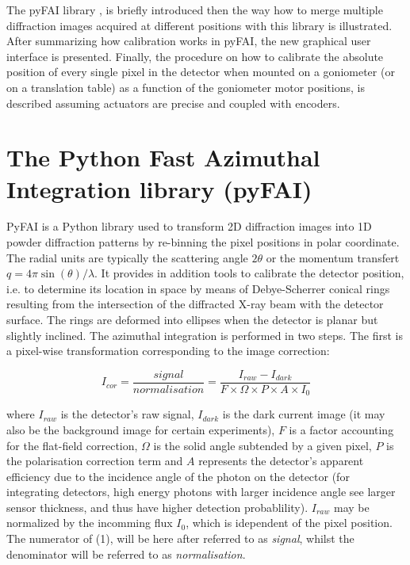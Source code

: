 \documentclass[preprint]{iucr}              %
\begin{document}
The pyFAI library \cite{fv5028}, is briefly introduced then the way how to
merge multiple diffraction images acquired at different positions with this
library \cite{PyFAI_PDJ} is illustrated. 
After summarizing how calibration works in pyFAI, the new graphical user
interface is presented.
Finally, the procedure on how to calibrate the absolute position of
every single pixel in the detector when mounted on a goniometer (or on a
translation table) as a function of the goniometer motor positions, is
described assuming actuators are precise and coupled with encoders. 

\section{The Python Fast Azimuthal Integration library (pyFAI)}

PyFAI is a Python \cite{python} library used to transform 2D diffraction images into
1D powder diffraction patterns by re-binning the pixel positions in polar
coordinate. 
The radial units are typically the scattering angle  
$2\theta$ or the momentum transfert $q=4\pi \sin(\theta)/\lambda$.
It provides in addition tools to calibrate the detector position, i.e.
to determine its location in space by means of Debye-Scherrer conical rings
resulting from the intersection of the diffracted X-ray beam with the
detector surface. 
The rings are deformed into ellipses when the detector is planar but 
slightly inclined. 
The azimuthal integration is performed in two steps. 
The first is a pixel-wise
transformation corresponding to the image correction:

\begin{equation}
I_{cor} = \frac{signal}{normalisation}  = \frac{I_{raw} - I_{dark}}{F \times
\Omega \times P \times A \times I_0} 
\end{equation}

where $I_{raw}$ is the detector's raw signal, $I_{dark}$ is the dark current
image (it may also be the background image for certain experiments), $F$ is a 
factor accounting for the flat-field correction, $\Omega$ is the solid
angle subtended by a given pixel, $P$ is the polarisation correction term and
$A$ represents the detector's apparent efficiency due to the incidence angle of the
photon on the detector (for integrating detectors, high energy photons with
larger incidence angle see larger sensor thickness, and thus have higher
detection probablility).
$I_{raw}$ may be normalized by the incomming flux $I_0$, which is
idependent of the pixel position.
The numerator of (1), will be here after referred to as
\textit{signal}, whilst the denominator will be referred to as
\textit{normalisation}.
\end{document}
